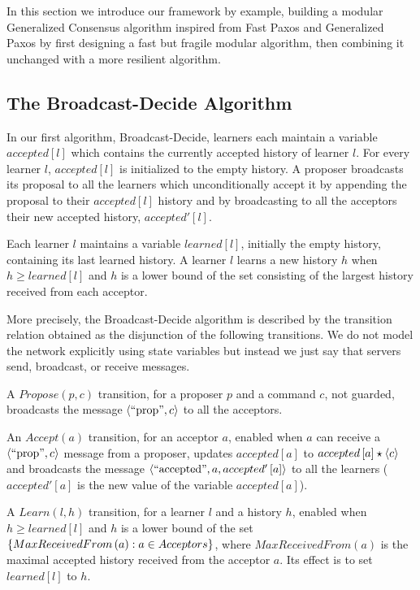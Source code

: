 In this section we introduce our framework by example, building a modular Generalized Consensus algorithm inspired from Fast Paxos and Generalized Paxos by first designing a fast but fragile modular algorithm, then combining it unchanged with a more resilient algorithm. 

\subsection{The Broadcast-Decide Algorithm}

In our first algorithm, Broadcast-Decide, learners each maintain a variable $accepted\left[ l \right]$ which contains the currently accepted history of learner $l$.
For every learner $l$, $accepted\left[ l \right]$ is initialized to the empty history.
A proposer broadcasts its proposal to all the learners which unconditionally accept it by appending the proposal to their $accepted\left[ l \right]$
history and by broadcasting to all the acceptors their new accepted history, $accepted'\left[ l \right]$.

Each learner $l$ maintains a variable $learned\left[ l \right]$, initially the empty history, containing its last learned history. A learner $l$
learns a new history $h$ when $h \geq learned\left[ l \right]$ and $h$ is a lower bound of the set consisting of the largest history received
from each acceptor.

More precisely, the Broadcast-Decide algorithm is described by the transition relation obtained as the disjunction of the
following transitions. We do not model the network explicitly using state variables but instead we just say that servers send, broadcast, or receive messages.

\begin{compactitem}

\item A $Propose\left( p,c \right)$ transition, for a proposer $p$ and a command $c$, not guarded, broadcasts the message $\left\langle\text{``prop''},c\right\rangle$ to all
the acceptors.

\item An $Accept\left( a \right)$ transition, for an acceptor $a$, enabled when $a$ can receive a $\left\langle\text{``prop''},c\right\rangle$ message from a proposer,
updates $accepted\left[ a \right]$ to $accepted\left[ a \right]\star \left\langle c\right\rangle$ and broadcasts the message $\left\langle\text{``accepted''}, a, accepted'\left[ a \right]\right\rangle$ to all the learners
($accepted'\left[ a \right]$ is the new value of the variable $accepted\left[ a \right]$).

\item A $Learn\left( l, h \right)$ transition, for a learner $l$ and a history $h$, enabled when $h \geq learned\left[ l \right]$ and $h$ is a lower
bound of the set $\left\{MaxReceivedFrom\left( a \right) : a \in Acceptors\right\}$, where $MaxReceivedFrom\left( a \right)$ is the maximal accepted history received
from the acceptor $a$.
 Its effect is to set $learned\left[ l \right]$ to $h$.

\end{compactitem}

